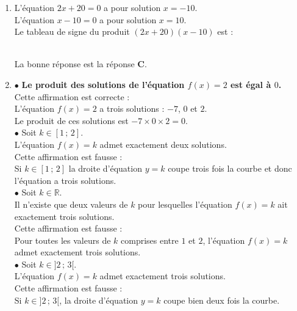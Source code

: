 \documentclass[a4paper,11pt]{article}
\begin{document}
{\begin{seanceD}{}
\begin{enumerate}
\begin{minipage}[c]{0.4\textwidth}
\begin{tikzpicture}[baseline,scale=0.7]
\end{tikzpicture}\end{minipage} 
            Comme la fonction racine carrée est définie sur $[0\,;\,+\infty[$, l'ensemble des solutions de l'inéquation $(I)$ est : {\bfseries \color[HTML]{F15929}$S = [0\,;\,144]$}.\\La bonne réponse est la réponse {\bfseries \color[HTML]{F15929}D}.

\item L'équation $2x+20=0$ a pour solution $x=-10$.\\
  L'équation $x-10=0$ a pour solution $x=10$.\\
  Le tableau de signe du produit $(2x+20)(x-10)$ est : \\
\\La bonne réponse est la réponse {\bfseries \color[HTML]{F15929}C}.

\item $\bullet$ {\bfseries \color[HTML]{F15929}Le produit des solutions de l'équation $f(x)=2$ est égal à $0$.}\\  Cette affirmation est correcte : \\L'équation $f(x)=2$ a trois solutions : $-7$, $0$ et $2$.\\
          Le produit de ces solutions est $-7\times 0\times 2= 0$.\\$\bullet$ Soit $k\in[1\,;\,2]$. \\
          L'équation $f(x)=k$ admet exactement deux solutions.\\  Cette affirmation est fausse : \\Si $k\in[1\,;\,2]$ la droite d'équation $y=k$ coupe trois fois la courbe et donc l'équation a trois solutions.\\$\bullet$ Soit $k\in\mathbb{R}$. \\
          Il n'existe que deux valeurs de $k$ pour lesquelles l'équation $f(x)=k$ ait exactement trois solutions.\\  Cette affirmation est fausse : \\Pour toutes les valeurs de $k$ comprises entre $1$ et $2$, l'équation $f(x)=k$ admet exactement trois solutions.\\$\bullet$ Soit $k\in]2\,;\,3[$. \\
          L'équation $f(x)=k$ admet exactement trois solutions.\\  Cette affirmation est fausse : \\Si $k\in]2\,;\,3[$,  la droite d'équation $y=k$ coupe bien deux fois la courbe.


\end{enumerate}
\end{seanceD}}
\end{document}
